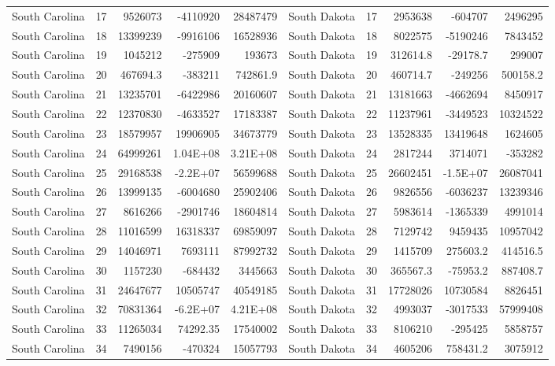 \begin{table}[]
\begin{tabular}{lrrrrlrrrr}
		South Carolina &  17 & 9526073 & -4110920 & 28487479 & South Dakota &  17 & 2953638 & -604707 & 2496295 \\
		South Carolina &  18 & 13399239 & -9916106 & 16528936 & South Dakota &  18 & 8022575 & -5190246 & 7843452 \\
		South Carolina &  19 & 1045212 & -275909 & 193673 & South Dakota &  19 & 312614.8 & -29178.7 & 299007 \\
		South Carolina &  20 & 467694.3 & -383211 & 742861.9 & South Dakota &  20 & 460714.7 & -249256 & 500158.2 \\
		South Carolina &  21 & 13235701 & -6422986 & 20160607 & South Dakota &  21 & 13181663 & -4662694 & 8450917 \\
		South Carolina &  22 & 12370830 & -4633527 & 17183387 & South Dakota &  22 & 11237961 & -3449523 & 10324522 \\
		South Carolina &  23 & 18579957 & 19906905 & 34673779 & South Dakota &  23 & 13528335 & 13419648 & 1624605 \\
		South Carolina &  24 & 64999261 & 1.04E+08 & 3.21E+08 & South Dakota &  24 & 2817244 & 3714071 & -353282 \\
		South Carolina &  25 & 29168538 & -2.2E+07 & 56599688 & South Dakota &  25 & 26602451 & -1.5E+07 & 26087041 \\
		South Carolina &  26 & 13999135 & -6004680 & 25902406 & South Dakota &  26 & 9826556 & -6036237 & 13239346 \\
		South Carolina &  27 & 8616266 & -2901746 & 18604814 & South Dakota &  27 & 5983614 & -1365339 & 4991014 \\
		South Carolina &  28 & 11016599 & 16318337 & 69859097 & South Dakota &  28 & 7129742 & 9459435 & 10957042 \\
		South Carolina &  29 & 14046971 & 7693111 & 87992732 & South Dakota &  29 & 1415709 & 275603.2 & 414516.5 \\
		South Carolina &  30 & 1157230 & -684432 & 3445663 & South Dakota &  30 & 365567.3 & -75953.2 & 887408.7 \\
		South Carolina &  31 & 24647677 & 10505747 & 40549185 & South Dakota &  31 & 17728026 & 10730584 & 8826451 \\
		South Carolina &  32 & 70831364 & -6.2E+07 & 4.21E+08 & South Dakota &  32 & 4993037 & -3017533 & 57999408 \\
		South Carolina &  33 & 11265034 & 74292.35 & 17540002 & South Dakota &  33 & 8106210 & -295425 & 5858757 \\
		South Carolina &  34 & 7490156 & -470324 & 15057793 & South Dakota &  34 & 4605206 & 758431.2 & 3075912
	\end{tabular}
\end{table}

